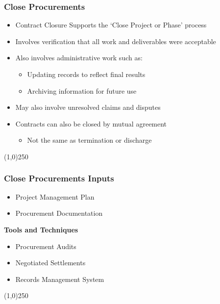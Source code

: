 \begin{frame}
\frametitle{Close Procurements}
\begin{itemize}
	\item Contract Closure Supports the `Close Project or Phase' process
	\item Involves verification that all work and deliverables were acceptable
	\item Also involves administrative work such as:
		\begin{itemize}
			\item Updating records to reflect final results
			\item Archiving information for future use
		\end{itemize}
\item May also involve unresolved claims and disputes
\item Contracts can also be closed by mutual agreement
		\begin{itemize}
			\item Not the same as termination or discharge
		\end{itemize}
\end{itemize}
\end{frame}\begin{center}\line(1,0){250}\end{center}




\begin{frame}
\frametitle{Close Procurements  \hfill\hfill Inputs}
\begin{itemize}
	\item Project Management Plan
	\item Procurement Documentation
\end{itemize}
\textbf{Tools and Techniques}
\begin{itemize}
	\item Procurement Audits
	\item Negotiated Settlements
	\item Records Management System
\end{itemize}
\end{frame}\begin{center}\line(1,0){250}\end{center}






